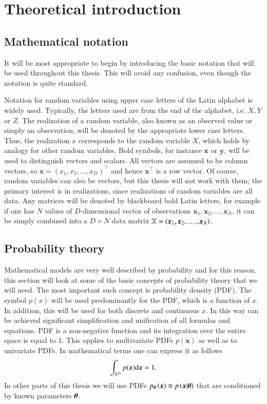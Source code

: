\chapter{Theoretical introduction}

\section{Mathematical notation}\label{sec:terminology}
It will be most appropriate to begin by introducing the basic notation that will be used throughout this thesis. This will avoid any confusion, even though the notation is quite standard. 

Notation for random variables using upper case letters of the Latin alphabet is widely used. Typically, the letters used are from the end of the alphabet, i.e. $X,Y$ or $Z$. The realization of a random variable, also known as an observed value or simply an observation, will be denoted by the appropriate lower case letters. Thus, the realization  $x$ corresponds to the random variable $X$, which holds by analogy for other random variables. Bold symbols, for instance $\boldsymbol{x}$ or $\boldsymbol{y}$, will be used to distinguish vectors and scalars. All vectors are assumed to be column vectors, so $\boldsymbol{x} = \left(x_1,x_2,\dots,x_D\right)^\top$ and hence $\boldsymbol{x}^\top$ is a row vector. Of course, random variables can also be vectors, but this thesis will not work with them; the primary interest is in realizations, since realizations of random variables are all data. Any matrices will be denoted by blackboard bold Latin letters, for example if one has $N$ values of $D$-dimensional vector of observations $\boldsymbol{x}_1,\boldsymbol{x}_2,\dots,\boldsymbol{x}_N$, it can be simply combined into a $D \times N$ data matrix $\mathbb{X}=\left(\boldsymbol{x}_{1},\boldsymbol{x}_{2},\dots,\boldsymbol{x}_{N}\right)$. 



\section{Probability theory}
Mathematical models are very well described by probability and for this reason, this section will look at some of the basic concepts of probability theory that we will need. The most important such concept is probability density (PDF). 
The symbol $p(x)$ will be used predominantly for the PDF, which is a function of $x$.  In addition, this will be used for both discrete and continuous $x$. In this way can be achieved significant simplification and unification of all formulas and equations. PDF is a non-negative function and its integration over the entire space is equal to 1. This applies to multivariate PDFs $p(\boldsymbol{x})$ as well as to univariate PDFs. In mathematical terms one can express it as follows
\begin{equation}
    \int_{\mathbb{R}^D}p(\boldsymbol{x})\mathrm{d}{\boldsymbol{x}} = 1.
\end{equation}
In other parts of this thesis we will use PDFs $p_{
\boldsymbol{\theta}}\left(\boldsymbol{x}\right) \equiv p\left(\boldsymbol{x}|\boldsymbol{\theta}\right)  $ that are conditioned by known parameters $\boldsymbol{\theta}$. 


